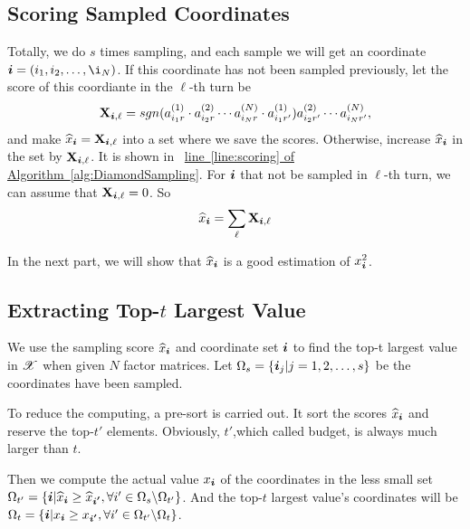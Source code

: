\documentclass{article}
\newcommand{\Sca}[3]{{#1}^{(#2)}_{i_#2#3}}%
\newcommand{\T}[1]{\boldsymbol{\mathscr{\MakeUppercase{#1}}}}
\newcommand{\V}[1]{{\bm{{\MakeLowercase{#1}}}}}
\newcommand{\M}[1]{{\bm{\mathbf{\MakeUppercase{#1}}}}}
\newcommand{\AlgLine}[2]{\hyperref[alg:#1]{line~\ref*{line:#2} of Algorithm~\ref*{alg:#1}}}
\begin{document}
\subsection{Scoring Sampled Coordinates}

Totally, we do $s$ times sampling, and each sample we will get an coordinate $\V{i} = (i_1,i_2,\ldots,\i_N) $. If this coordinate has not been sampled previously, let the score of this coordiante in the $\ell $-th turn be
\[
\M{X}_{\V{i},\ell}  = sgn(\Sca{a}{1}{r}\cdot\Sca{a}{2}{r}\cdots\Sca{a}{N}{r}\cdot\Sca{a}{1}{r'}) \Sca{a}{2}{r'}\cdots\Sca{a}{N}{r'},
\]
and make $\widehat{x}_{\V{i}} = \M{X}_{\V{i},\ell}$ into a set where we save the scores. Otherwise, increase $\widehat{x}_{\V{i}}$ in the set by $\M{X}_{\V{i},\ell}$. It is shown in ~\AlgLine{DiamondSampling}{scoring}. For $\V{i}$ that not be sampled in $\ell$-th turn, we can assume that $\M{X}_{\V{i},\ell}=0$. So
\[
\widehat{x}_{\V{i}} = \sum_{\ell} \M{X}_{\V{i},\ell}
\]

In the next part, we will show that $\widehat{x}_{\V{i}}$ is a good estimation of $x_{\V{i}}^2$.

\subsection{Extracting Top-$t$ Largest Value}

We use the sampling score $\widehat{x}_{\V{i}}$ and coordinate set $\V{i}$ to find the top-t largest value in $\T{X}$ when given $N$ factor matrices. Let $\Omega_s = \{\V{i}_j|j = 1,2,\ldots,s\}$ be the coordinates have been sampled.

To reduce the computing, a pre-sort is carried out. It sort the scores $\widehat{x}_{\V{i}}$ and reserve the top-$t'$ elements. Obviously, $t'$,which called budget, is always much larger than $t$.

Then we compute the actual value $x_{\V{i}}$ of the coordinates in the less small set $\Omega_{t'} = \{\V{i}|\widehat{x}_{\V{i}}\geq \widehat{x}_{\V{i'}},\forall i'\in \Omega_{s} \backslash \Omega_{t'}\}$. And the top-$t$ largest value's coordinates will be $\Omega_{t}=\{\V{i}|x_{\V{i}}\geq x_{\V{i'}},\forall i' \in \Omega_{t'} \backslash \Omega_{t} \}$.
\end{document}
